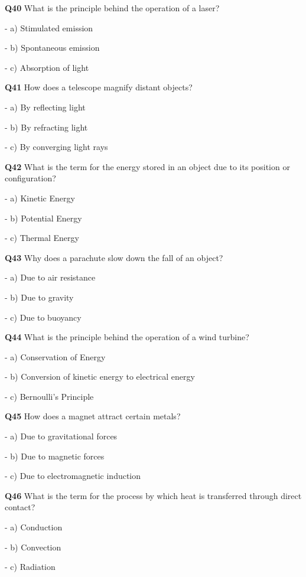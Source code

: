 \textbf{Q40} What is the principle behind the operation of a laser?\par
\quad - a) Stimulated emission\par
\quad - b) Spontaneous emission\par
\quad - c) Absorption of light\par

\textbf{Q41} How does a telescope magnify distant objects?\par
\quad - a) By reflecting light\par
\quad - b) By refracting light\par
\quad - c) By converging light rays\par

\textbf{Q42} What is the term for the energy stored in an object due to its position or configuration?\par
\quad - a) Kinetic Energy\par
\quad - b) Potential Energy\par
\quad - c) Thermal Energy\par

\textbf{Q43} Why does a parachute slow down the fall of an object?\par
\quad - a) Due to air resistance\par
\quad - b) Due to gravity\par
\quad - c) Due to buoyancy\par

\textbf{Q44} What is the principle behind the operation of a wind turbine?\par
\quad - a) Conservation of Energy\par
\quad - b) Conversion of kinetic energy to electrical energy\par
\quad - c) Bernoulli's Principle\par

\textbf{Q45} How does a magnet attract certain metals?\par
\quad - a) Due to gravitational forces\par
\quad - b) Due to magnetic forces\par
\quad - c) Due to electromagnetic induction\par

\textbf{Q46} What is the term for the process by which heat is transferred through direct contact?\par
\quad - a) Conduction\par
\quad - b) Convection\par
\quad - c) Radiation\par

